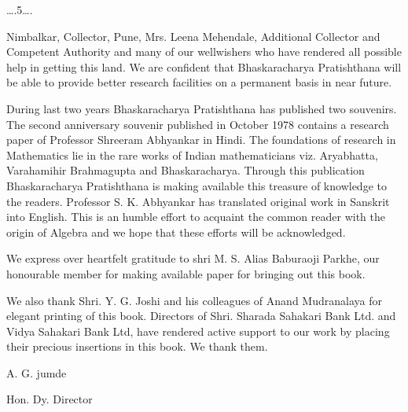 \documentclass[]{article}
\date{}
\begin{document}
{ \ldots{}.5\ldots{}.}

{Nimbalkar, Collector, Pune, Mrs. Leena Mehendale, Additional Collector
and Competent Authority and many of our wellwishers who have rendered
all possible help in getting this land. We are confident that
Bhaskaracharya Pratishthana will be able to provide better research
facilities on a permanent basis in near future.}

{During last two years Bhaskaracharya Pratishthana has published two
souvenirs. The second anniversary souvenir published in October 1978
contains a research paper of Professor Shreeram Abhyankar in Hindi. The
foundations of research in Mathematics lie in the rare works of Indian
mathematicians viz. Aryabhatta, Varahamihir Brahmagupta and
Bhaskaracharya. Through this publication Bhaskaracharya Pratishthana is
making available this treasure of knowledge to the readers. Professor S.
K. Abhyankar has translated original work in Sanskrit into English. This
is an humble effort to acquaint the common reader with the origin of
Algebra and we hope that these efforts will be acknowledged.}

{We express over heartfelt gratitude to shri M. S. Alias Baburaoji
Parkhe, our honourable member for making available paper for bringing
out this book.}

{We also thank Shri. Y. G. Joshi and his colleagues of Anand Mudranalaya
for elegant printing of this book. Directors of Shri. Sharada Sahakari
Bank Ltd. and Vidya Sahakari Bank Ltd, have rendered active support to
our work by placing their precious insertions in this book. We thank
them. }

{A. G. jumde}

{Hon. Dy. Director\\
}
\end{document}
